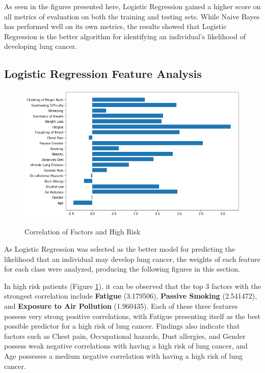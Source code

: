 \documentclass[runningheads]{llncs}
\begin{document}
As seen in the figures presented here, Logistic Regression gained a higher score on all metrics of evaluation on both the training and testing sets. While Naive Bayes has performed well on its own metrics, the results showed that Logistic Regression is the better algorithm for identifying an individual’s likelihood of developing lung cancer.

\subsection{Logistic Regression Feature Analysis}

\begin{figure}[!htb]           	 
\centering               	 
\caption{Correlation of Factors and High Risk}
\includegraphics[scale=0.5]{fta-high.png}  	 
\label{fig:fta-high}
\end{figure}

As Logistic Regression was selected as the better model for predicting the likelihood that an individual may develop lung cancer, the weights of each feature for each class were analyzed, producing the following figures in this section.

In high risk patients (Figure \ref{fig:fta-high}), it can be observed that the top 3 factors with the strongest correlation include \textbf{Fatigue} (3.179506), \textbf{Passive Smoking} (2.541472), and \textbf{Exposure to Air Pollution} (1.960435). Each of these three features possess very strong positive correlations, with Fatigue presenting itself as the best possible predictor for a high risk of lung cancer. Findings also indicate that factors such as Chest pain, Occupational hazards, Dust allergies, and Gender possess weak negative correlations with having a high risk of lung cancer, and Age possesses a medium negative correlation with having a high risk of lung cancer.
\end{document}
